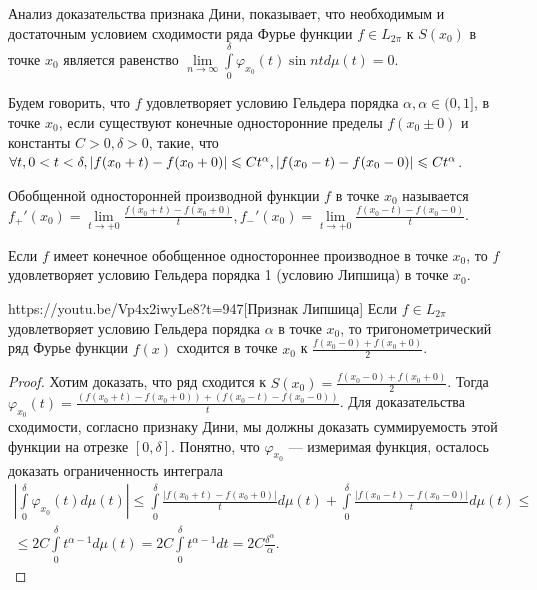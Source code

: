 \begin{note}
	Анализ доказательства признака Дини, показывает, что необходимым и достаточным условием сходимости ряда Фурье функции $f\in L_{2\pi}$ к $S(x_0)$ в точке $x_0$ является равенство $\lim\limits_{n\to\infty}\int\limits_{0}^\delta\varphi_{x_0}(t)\sin ntd\mu(t)=0$.
\end{note}

\begin{Def}
	Будем говорить, что $f$ удовлетворяет условию Гельдера порядка $\alpha, {\alpha\in (0,1]}$, в точке $x_0$, если существуют конечные односторонние пределы $f(x_0\pm 0)$ и константы $C>0, \delta>0$, такие, что $\forall t, 0<t<\delta, |f(x_0+t)-f(x_0+0)|\leqslant Ct^\alpha,\\ {|f(x_0-t)-f(x_0-0)|\leqslant Ct^\alpha}$.
\end{Def}

\begin{Def}
	Обобщенной односторонней производной функции $f$ в точке $x_0$ называется $f_+'(x_0)=\lim\limits_{t\to+0}\frac{f(x_0+t)-f(x_0+0)}{t}, f_-'(x_0)=\lim\limits_{t\to+0}\frac{f(x_0-t)-f(x_0-0)}{t}$.
\end{Def}

\begin{prop}
	Если $f$ имеет конечное обобщенное одностороннее производное в точке $x_0$, то $f$ удовлетворяет условию Гельдера порядка 1 (условию Липшица) в точке $x_0$.
\end{prop}

\begin{linkthm}{https://youtu.be/Vp4x2iwyLe8?t=947}[Признак Липшица]
	Если $f\in L_{2\pi}$ удовлетворяет условию Гельдера порядка $\alpha$ в точке $x_0$, то тригонометрический ряд Фурье функции $f(x)$ сходится в точке $x_0$ к $\frac{f(x_0-0)+f(x_0+0)}{2}$.
\end{linkthm}
\begin{proof}
	Хотим доказать, что ряд сходится к $S(x_0)=\frac{f(x_0-0)+f(x_0+0)}{2}$. Тогда $\varphi_{x_0}(t)=\frac{(f(x_0+t)-f(x_0+0))+(f(x_0-t)-f(x_0-0))}{t}$. Для доказательства сходимости, согласно признаку Дини, мы должны доказать суммируемость этой функции на отрезке $[0, \delta]$. Понятно, что $\varphi_{x_0}$ --- измеримая функция, осталось доказать ограниченность интеграла
	\begin{multline*}
		\left|\int\limits_{0}^\delta\varphi_{x_0}(t)d\mu(t)\right|\leqslant \int\limits_{0}^\delta\frac{|f(x_0+t)-f(x_0+0)|}{t}d\mu(t)+
		\int\limits_{0}^\delta\frac{|f(x_0-t)-f(x_0-0)|}{t}d\mu(t)\leqslant\\\leqslant 2C\int\limits_{0}^\delta t^{\alpha-1}d\mu(t)=2C\int\limits_{0}^\delta t^{\alpha-1}dt=2C\frac{\delta^\alpha}{\alpha}.
	\end{multline*}
\end{proof}

